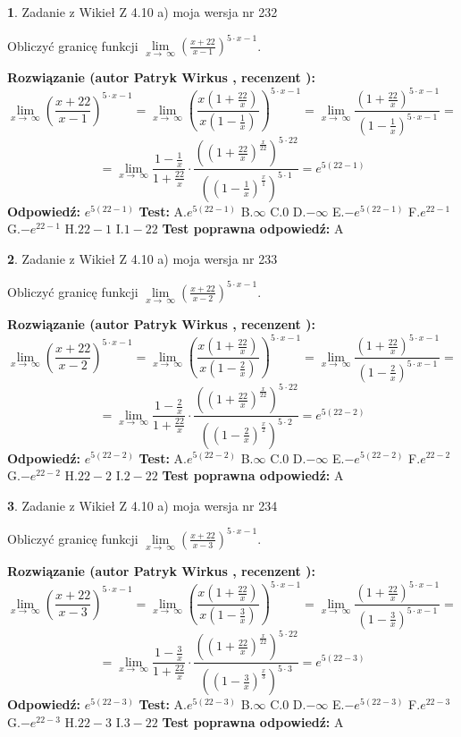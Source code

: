 \documentclass[12pt, a4paper]{article}
\theoremstyle{definition} %
\newtheorem{zad}{}
\newcommand{\zadStart}[1]{\begin{zad}#1\newline}
\newcommand{\zadStop}{\end{zad}}
\newcommand{\rozwStart}[2]{\noindent \textbf{Rozwiązanie (autor #1 , recenzent #2): }\newline}
\newcommand{\rozwStop}{\newline}
\newcommand{\odpStart}{\noindent \textbf{Odpowiedź:}\newline}
\newcommand{\odpStop}{\newline}
\newcommand{\testStart}{\noindent \textbf{Test:}\newline}
\newcommand{\testStop}{\newline}
\newcommand{\kluczStart}{\noindent \textbf{Test poprawna odpowiedź:}\newline}
\newcommand{\kluczStop}{\newline}
\begin{document}
\zadStart{Zadanie z Wikieł Z 4.10 a) moja wersja nr 232}


Obliczyć granicę funkcji  $\lim\limits_{x\to\ \infty}(\frac{x+22}{x-1})^{5\cdot x-1}$.
\zadStop
\rozwStart{Patryk Wirkus}{}
$$\lim\limits_{x\to\ \infty}(\frac{x+22}{x-1})^{5\cdot x-1} = \lim\limits_{x\to\ \infty}(\frac{x(1+\frac{22}{x})}{x(1-\frac{1}{x})})^{5\cdot x-1}=\lim\limits_{x\to\ \infty}\frac{(1+\frac{22}{x})^{5\cdot x-1}}{(1-\frac{1}{x})^{5\cdot x-1}}=$$
$$=\lim\limits_{x\to\ \infty}\frac{1-\frac{1}{x}}{1+\frac{22}{x}}\cdot\frac{((1+\frac{22}{x})^{\frac{x}{22}})^{5\cdot22}}{((1-\frac{1}{x})^{\frac{x}{1}})^{5\cdot1}}=e^{5(22-1)}$$
\rozwStop
\odpStart
$e^{5(22-1)}$
\odpStop
\testStart
A.$e^{5(22-1)}$ B.$\infty$ C.$0$ D.$-\infty$ E.$-e^{5(22-1)}$
F.$e^{22-1}$ G.$-e^{22-1}$
H.$22-1$
I.$1-22$
\testStop
\kluczStart
A
\kluczStop



\zadStart{Zadanie z Wikieł Z 4.10 a) moja wersja nr 233}


Obliczyć granicę funkcji  $\lim\limits_{x\to\ \infty}(\frac{x+22}{x-2})^{5\cdot x-1}$.
\zadStop
\rozwStart{Patryk Wirkus}{}
$$\lim\limits_{x\to\ \infty}(\frac{x+22}{x-2})^{5\cdot x-1} = \lim\limits_{x\to\ \infty}(\frac{x(1+\frac{22}{x})}{x(1-\frac{2}{x})})^{5\cdot x-1}=\lim\limits_{x\to\ \infty}\frac{(1+\frac{22}{x})^{5\cdot x-1}}{(1-\frac{2}{x})^{5\cdot x-1}}=$$
$$=\lim\limits_{x\to\ \infty}\frac{1-\frac{2}{x}}{1+\frac{22}{x}}\cdot\frac{((1+\frac{22}{x})^{\frac{x}{22}})^{5\cdot22}}{((1-\frac{2}{x})^{\frac{x}{2}})^{5\cdot2}}=e^{5(22-2)}$$
\rozwStop
\odpStart
$e^{5(22-2)}$
\odpStop
\testStart
A.$e^{5(22-2)}$ B.$\infty$ C.$0$ D.$-\infty$ E.$-e^{5(22-2)}$
F.$e^{22-2}$ G.$-e^{22-2}$
H.$22-2$
I.$2-22$
\testStop
\kluczStart
A
\kluczStop



\zadStart{Zadanie z Wikieł Z 4.10 a) moja wersja nr 234}


Obliczyć granicę funkcji  $\lim\limits_{x\to\ \infty}(\frac{x+22}{x-3})^{5\cdot x-1}$.
\zadStop
\rozwStart{Patryk Wirkus}{}
$$\lim\limits_{x\to\ \infty}(\frac{x+22}{x-3})^{5\cdot x-1} = \lim\limits_{x\to\ \infty}(\frac{x(1+\frac{22}{x})}{x(1-\frac{3}{x})})^{5\cdot x-1}=\lim\limits_{x\to\ \infty}\frac{(1+\frac{22}{x})^{5\cdot x-1}}{(1-\frac{3}{x})^{5\cdot x-1}}=$$
$$=\lim\limits_{x\to\ \infty}\frac{1-\frac{3}{x}}{1+\frac{22}{x}}\cdot\frac{((1+\frac{22}{x})^{\frac{x}{22}})^{5\cdot22}}{((1-\frac{3}{x})^{\frac{x}{3}})^{5\cdot3}}=e^{5(22-3)}$$
\rozwStop
\odpStart
$e^{5(22-3)}$
\odpStop
\testStart
A.$e^{5(22-3)}$ B.$\infty$ C.$0$ D.$-\infty$ E.$-e^{5(22-3)}$
F.$e^{22-3}$ G.$-e^{22-3}$
H.$22-3$
I.$3-22$
\testStop
\kluczStart
A
\kluczStop
\end{document}
